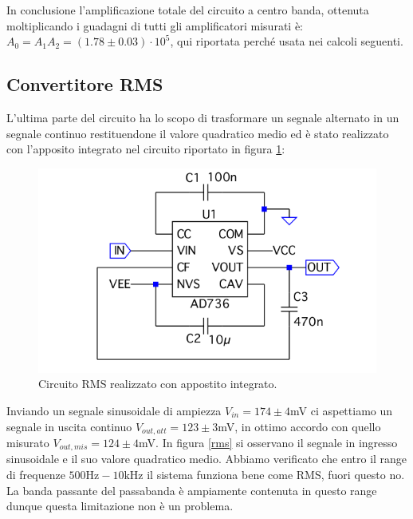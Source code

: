 \documentclass[10pt,a4paper]{article}
\begin{document}
In conclusione l'amplificazione totale del circuito a centro banda, ottenuta moltiplicando i guadagni di tutti gli amplificatori misurati è: $A_0 = A_1 A_2 = (1.78 \pm 0.03) \cdot 10^5$, qui riportata perché usata nei calcoli seguenti.

\subsection{Convertitore RMS}
L'ultima parte del circuito ha lo scopo di trasformare un segnale alternato in un segnale continuo restituendone il valore quadratico medio ed è stato realizzato con l'apposito integrato nel circuito riportato in figura \ref{rmsCircuito}:

\begin{figure}[!htb]
\centering
\includegraphics[scale=0.5]{rms.png}
\caption{Circuito RMS realizzato con appostito integrato.\label{rmsCircuito}}
\end{figure}

Inviando un segnale sinusoidale di ampiezza $V_{in} = 174 \pm 4$mV ci aspettiamo un segnale in uscita continuo $V_{out, att} = 123 \pm 3$mV, in ottimo accordo con quello misurato $V_{out, mis} = 124 \pm 4$mV. In  figura \ref{rms} si osservano il segnale in ingresso sinusoidale e il suo valore quadratico medio. Abbiamo verificato che entro il range di frequenze $500 \mbox{Hz} - 10 \mbox{kHz}$ il sistema funziona bene come RMS, fuori questo no. La banda passante del passabanda è ampiamente contenuta in questo range dunque questa limitazione non è un problema.
\end{document}
